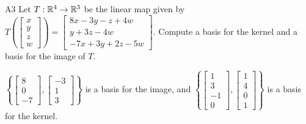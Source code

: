 \begin{problem}{A3}
Let $T: \mathbb{R}^4 \rightarrow \mathbb{R}^3$ be the linear map given by $T\left(\begin{bmatrix} x \\ y \\ z \\ w \end{bmatrix} \right) = \begin{bmatrix}  8x-3y-z+4w \\ y+3z-4w \\ -7x+3y+2z-5w\end{bmatrix} $.
Compute a basis for the kernel and a basis for the image of $T$.
\end{problem}
\begin{solution}
\(\left\{ \begin{bmatrix} 8 \\ 0 \\ -7 \end{bmatrix}, \begin{bmatrix} -3 \\ 1 \\ 3 \end{bmatrix} \right\}\) is a basis for the image, and \( \left\{ \begin{bmatrix} 1 \\ 3 \\ -1 \\ 0 \end{bmatrix}, \begin{bmatrix} 1 \\ 4 \\ 0 \\ 1 \end{bmatrix} \right\} \) is a basis for the kernel.
\end{solution}



